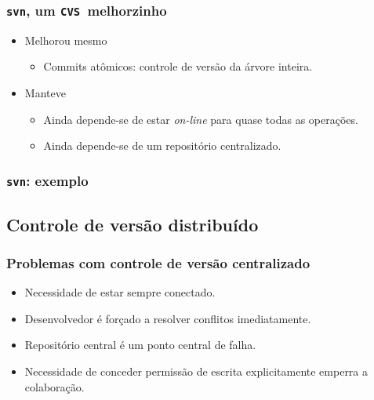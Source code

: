 \documentclass{beamer}
\newcommand{\svn}{\texttt{svn}}
\newcommand{\cvs}{\texttt{CVS}}
\begin{document}
\begin{frame}
  \frametitle{\svn, um \cvs\ melhorzinho}
  \begin{itemize}
    \item Melhorou mesmo
      \begin{itemize}
        \item Commits atômicos: controle de versão da árvore inteira.
      \end{itemize}
    \item Manteve
      \begin{itemize}
        \item Ainda depende-se de estar \emph{on-line} para quase todas
          as operações.
        \item Ainda depende-se de um repositório centralizado.
      \end{itemize}
  \end{itemize}
\end{frame}

\begin{frame}
  \frametitle{\svn: exemplo}
  \begin{figure}[h]
    \begin{center}
    \end{center}
    \label{fig:svn}
  \end{figure}
\end{frame}


\subsection{Controle de versão distribuído}

\begin{frame}
  \frametitle{Problemas com controle de versão centralizado}
  \begin{itemize}
      \pause
    \item Necessidade de estar sempre conectado.
      \pause
    \item Desenvolvedor é forçado a resolver conflitos imediatamente.
      \pause
    \item Repositório central é um ponto central de falha.
      \pause
    \item Necessidade de conceder permissão de escrita explicitamente
      emperra a colaboração.
  \end{itemize}
\end{frame}
\end{document}
